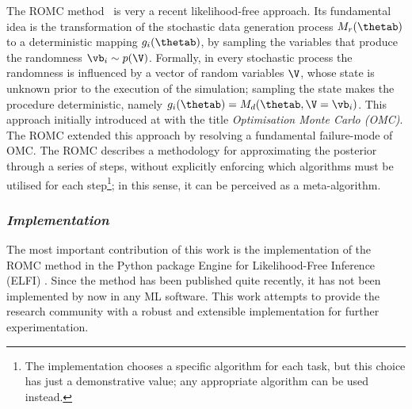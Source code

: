 The ROMC method~\cite{Ikonomov2019} is very a recent
likelihood-free approach. Its fundamental idea is the transformation
of the stochastic data generation process $M_r(\thetab)$ to a
deterministic mapping $g_i(\thetab)$, by sampling the variables that
produce the randomness $\vb_i \sim p(\V)$. Formally, in every
stochastic process the randomness is influenced by a vector of random
variables $\V$, whose state is unknown prior to the execution of the
simulation; sampling the state makes the procedure deterministic,
namely $g_i(\thetab) = M_d(\thetab, \V=\vb_i)$. This approach
initially introduced at \cite{Meeds2015} with the title
\textit{Optimisation Monte Carlo (OMC)}. The ROMC extended this
approach by resolving a fundamental failure-mode of OMC\@. The ROMC
describes a methodology for approximating the posterior through a
series of steps, without explicitly enforcing which algorithms must be
utilised for each step\footnote{The implementation chooses a specific
  algorithm for each task, but this choice has just a demonstrative
  value; any appropriate algorithm can be used instead.}; in this
sense, it can be perceived as a meta-algorithm.

\subsubsection*{\textit{Implementation}}

The most important contribution of this work is the implementation of
the ROMC method in the Python package Engine for Likelihood-Free
Inference (ELFI) \cite{1708.00707}. Since the method has been
published quite recently, it has not been implemented by now in any ML
software. This work attempts to provide the research community with a
robust and extensible implementation for further experimentation.
